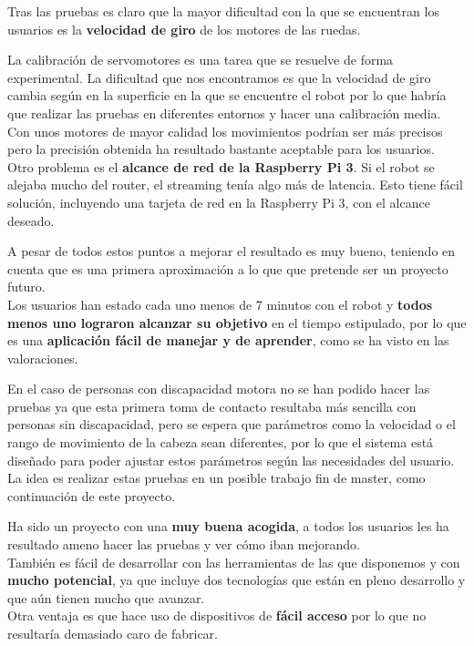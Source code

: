 \documentclass[twoside, 11pt]{epstfg}
\begin{document}
Tras las pruebas es claro que la mayor dificultad con la que se encuentran los usuarios es la \textbf{velocidad de giro} de los motores de las ruedas.

La calibración de servomotores es una tarea que se resuelve de forma experimental. La dificultad que nos encontramos es que la velocidad de giro cambia según en la superficie en la que se encuentre el robot por lo que habría que realizar las pruebas en diferentes entornos y hacer una calibración media.\\Con unos motores de mayor calidad los movimientos podrían ser más precisos pero la precisión obtenida ha resultado bastante aceptable para los usuarios.\\
Otro problema es el \textbf{alcance de red de la Raspberry Pi 3}. Si el robot se alejaba mucho del router, el streaming tenía algo más de latencia. Esto tiene fácil solución, incluyendo una tarjeta de red en la Raspberry Pi 3, con el alcance deseado.

A pesar de todos estos puntos a mejorar el resultado es muy bueno, teniendo en cuenta que es una primera aproximación a lo que que pretende ser un proyecto futuro.\\Los usuarios han estado cada uno menos de 7 minutos con el robot y \textbf{todos menos uno lograron alcanzar su objetivo} en el tiempo estipulado, por lo que es una \textbf{aplicación fácil de manejar y de aprender}, como se ha visto en las valoraciones.

En el caso de personas con discapacidad motora no se han podido hacer las pruebas ya que esta primera toma de contacto resultaba más sencilla con personas sin discapacidad, pero se espera que parámetros como la velocidad o el rango de movimiento de la cabeza sean diferentes, por lo que el sistema está diseñado para poder ajustar estos parámetros según las necesidades del usuario. La idea es realizar estas pruebas en un posible trabajo fin de master, como continuación de este proyecto.

Ha sido un proyecto con una \textbf{muy buena acogida}, a todos los usuarios les ha resultado ameno hacer las pruebas y ver cómo iban mejorando.\\
También es fácil de desarrollar con las herramientas de las que disponemos y con \textbf{mucho potencial}, ya que incluye dos tecnologías que están en pleno desarrollo y que aún tienen mucho que avanzar.\\
Otra ventaja es que hace uso de dispositivos de \textbf{fácil acceso} por lo que no resultaría demasiado caro de fabricar.
\end{document}
